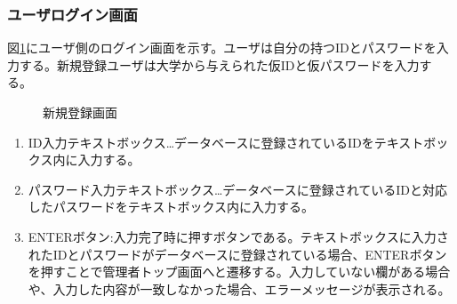 \documentclass[a4j]{jarticle}
\begin{document}
\subsubsection{ユーザログイン画面}
図\ref{fig:login_user}にユーザ側のログイン画面を示す。ユーザは自分の持つIDとパスワードを入力する。新規登録ユーザは大学から与えられた仮IDと仮パスワードを入力する。
\begin{figure}[H]
\centering
{}
\caption{新規登録画面}
\label{fig:login_user}
\end{figure}
\begin{enumerate}
  \renewcommand{\labelenumi}{\textcircled{\scriptsize \theenumi}}

\item ID入力テキストボックス…データベースに登録されているIDをテキストボックス内に入力する。
\item パスワード入力テキストボックス…データベースに登録されているIDと対応したパスワードをテキストボックス内に入力する。
\item ENTERボタン:入力完了時に押すボタンである。テキストボックスに入力されたIDとパスワードがデータベースに登録されている場合、ENTERボタンを押すことで管理者トップ画面へと遷移する。入力していない欄がある場合や、入力した内容が一致しなかった場合、エラーメッセージが表示される。
\end{enumerate}
\end{document}
